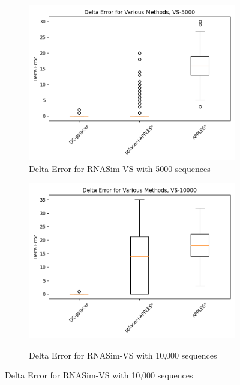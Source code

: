 \documentclass[10pt]{article}
\begin{document}
\begin{figure}[!htb]
\begin{subfigure}{0.5\textwidth}
\centering
\includegraphics[width=\textwidth]{Figs/VS-delta-error-5000-BW.png}
\caption{Delta Error for RNASim-VS with 5000 sequences}
\label{fig:error5000}
\end{subfigure}
\begin{subfigure}{0.5\textwidth}
\centering
\includegraphics[width=\textwidth]{Figs/VS-delta-error-10000-BW.png}
\label{fig:error10000}
\caption{Delta Error for RNASim-VS with 10,000 sequences}
\end{subfigure}%
\end{figure}
\end{document}
